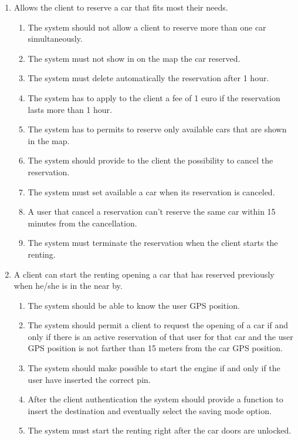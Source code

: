 \begin{enumerate}
\item Allows the client to reserve a car that fits most their needs.
\begin{enumerate}
\item  The system should not allow a client to reserve more than one car simultaneously.
\item The system must not show in on the map the car reserved. 
\item The system must delete automatically the reservation after 1 hour.
\item The system has to apply to the client a fee of 1 euro if the reservation lasts more than 1 hour.
\item The system has to permits to reserve only available cars that are shown in the map.
\item The system should provide to the client the possibility to cancel the reservation.
\item The system must set available a car when its reservation is canceled.
\item A user that cancel a reservation can't reserve the same car within 15 minutes from the cancellation.
\item The system must terminate the reservation when the client starts the renting.
\end{enumerate}


\item A client can start the renting opening a car that has reserved previously when he/she is in the near by.

\begin{enumerate}
\item The system should be able to know the user GPS position.
\item The system should permit a client to request the opening of a car if and only if there is an active reservation of that user for that car and the user GPS position is not farther than 15 meters from the car GPS position.
\item The system should make possible to start the engine if and only if the user have inserted the correct pin.
\item After the client authentication the system should provide a function to insert the destination and eventually select the saving mode option. 
\item The system must start the renting right after the car doors are unlocked.
\end{enumerate}


\end{enumerate}
